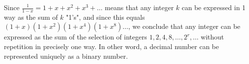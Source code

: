 \documentclass[12pt, letterpaper, onecolumn, conference, final]{IEEEtran}
\theoremstyle{definition}
\newtheorem{definition}{Definition}[section]
\theoremstyle{plain}
\begin{document}
\vspace{.3cm}
\begin{center}
\end{center}

\newpage
\noindent
Since $\frac{1}{1-x} = 1 + x + x^2 + x^3 + \dots$ means that any integer $k$ can be expressed in 1 way as the sum of $k$ "1's", and since this equals $(1+x)(1+x^2)(1+x^4)(1+x^8)\dots$, we conclude that any integer can be expressed as the sum of the selection of integers $1,2,4,8,\dots,2^r,\dots$ without repetition in precisely one way. In other word, a decimal number can be represented uniquely as a binary number.
\end{document}
